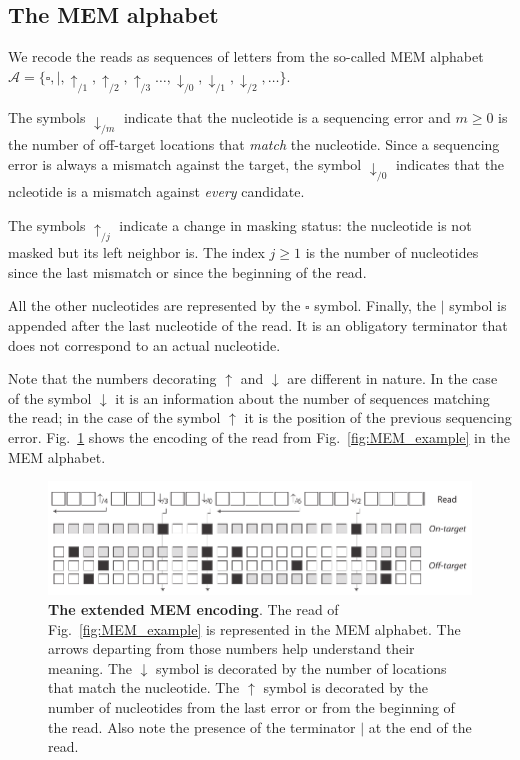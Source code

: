\documentclass{article}
\begin{document}
\subsection{The MEM alphabet}

We recode the reads as sequences of letters from the so-called MEM
alphabet $\mathcal{A} = \{\square, |, \uparrow_{/1}, \uparrow_{/2},
\uparrow_{/3} \ldots, \downarrow_{/0}, \downarrow_{/1}, \downarrow_{/2},
\ldots\}$.

The symbols $\downarrow_{/m}$ indicate that the nucleotide is a sequencing
error and $m \geq 0$ is the number of off-target locations that
\emph{match} the nucleotide. Since a sequencing error is always a mismatch
against the target, the symbol $\downarrow_{/0}$ indicates that the
ncleotide is a mismatch against \emph{every} candidate.

The symbols $\uparrow_{/j}$ indicate a change in masking status: the
nucleotide is not masked but its left neighbor is. The index $j \geq 1$ is
the number of nucleotides since the last mismatch or since the beginning
of the read.

All the other nucleotides are represented by the $\square$ symbol.
Finally, the $|$ symbol is appended after the last nucleotide of the read.
It is an obligatory terminator that does not correspond to an actual
nucleotide.

Note that the numbers decorating $\uparrow$ and $\downarrow$ are different
in nature. In the case of the symbol $\downarrow$ it is an information
about the number of sequences matching the read; in the case of the symbol
$\uparrow$ it is the position of the previous sequencing error.
Fig.~\ref{fig:sketch_extended} shows the encoding of the read from
Fig.~\ref{fig:MEM_example} in the MEM alphabet.

\begin{figure}[h]
\centering
\includegraphics[scale=.85]{sketch_extended.pdf}
\caption{\textbf{The extended MEM encoding}.
The read of Fig.~\ref{fig:MEM_example} is represented in the MEM alphabet.
The arrows departing from those numbers help understand their meaning. The
$\downarrow$ symbol is decorated by the number of locations that match the
nucleotide. The $\uparrow$ symbol is decorated by the number of
nucleotides from the last error or from the beginning of the read. Also
note the presence of the terminator $|$ at the end of the read.}
\label{fig:sketch_extended}
\end{figure}
\end{document}
